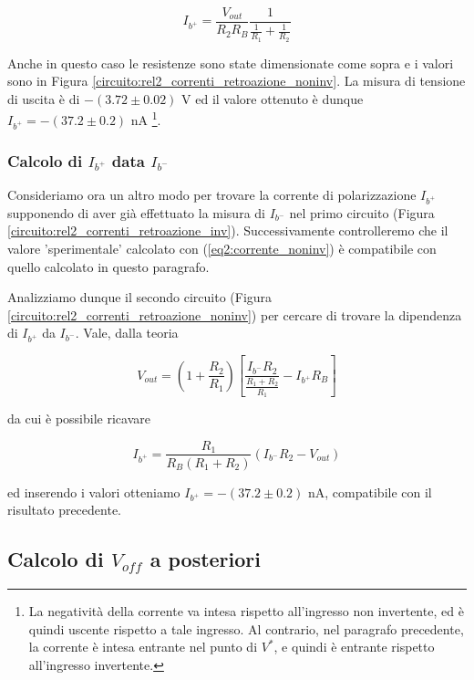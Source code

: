 \begin{equation}
I_{b^+}=\frac{V_{out}}{R_2 R_B}\frac{1}{\frac{1}{R_1}+\frac{1}{R_2}}
\label{eq2:corrente_noninv}
\end{equation}

Anche in questo caso le resistenze sono state dimensionate come sopra e i valori sono in Figura \ref{circuito:rel2_correnti_retroazione_noninv}. La misura di tensione di uscita è di $-(3.72 \pm 0.02)$   \si{\volt} ed il valore ottenuto è dunque $I_{b^+} = - (37.2 \pm 0.2)$ \si{\nano\ampere} \footnote{La negatività della corrente va intesa rispetto all'ingresso non invertente, ed è quindi uscente rispetto a tale ingresso. Al contrario, nel paragrafo precedente, la corrente è intesa entrante nel punto di $V^*$, e quindi è entrante rispetto all'ingresso invertente.}.

\subsubsection*{Calcolo di $I_{b^+}$ data $I_{b^-}$}

Consideriamo ora un altro modo per trovare la corrente di polarizzazione $I_{b^+}$ supponendo di aver già effettuato la misura di $I_{b^-}$ nel primo circuito (Figura \ref{circuito:rel2_correnti_retroazione_inv}). Successivamente controlleremo che il valore 'sperimentale' calcolato con (\ref{eq2:corrente_noninv}) è compatibile con quello calcolato in questo paragrafo.

Analizziamo dunque il secondo circuito (Figura \ref{circuito:rel2_correnti_retroazione_noninv}) per cercare di trovare la dipendenza di $I_{b^+}$ da $I_{b^-}$. Vale, dalla teoria

\begin{equation}
V_{out} = \left( 1+\frac{R_2}{R_1} \right)\left[ \frac{I_{b^-}R_2}{\frac{R_1+R_2}{R_1}} - I_{b^+} R_B\right]
\label{eq2:Vout_currents}
\end{equation}

da cui è possibile ricavare

$$I_{b^+} = \frac{R_1}{R_B(R_1+R_2)}(I_{b^-} R_2-V_{out})$$

ed inserendo i valori otteniamo $I_{b^+} = - (37.2 \pm 0.2)$ \si{\nano\ampere}, compatibile con il risultato precedente.

\subsection{Calcolo di $V_{off}$ a posteriori}

